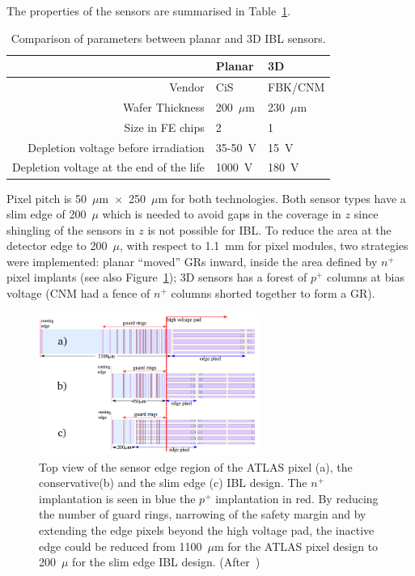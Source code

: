 The properties of the sensors are summarised in Table~\ref{tab:IBLsensors}.

\begin{table}[!htpb]
\caption{\label{tab:IBLsensors}Comparison of parameters between planar and 3D IBL sensors.}
\centering
\begin{tabular}{|r|l|l|}
\hline
 & Planar & 3D\\
 \hline
 \hline
 Vendor & CiS & FBK/CNM \\
 Wafer Thickness & 200~$\mu$m & 230~$\mu$m \\
 Size in FE chips & 2 & 1\\
 Depletion voltage before irradiation & 35-50~V & 15~V \\
 Depletion voltage at the end of the life & 1000~V & 180~V\\
 \hline
 \end{tabular}
\end{table}



Pixel pitch is 50~$\mu$m~$\times$~250~$\mu$m for both technologies. 
Both sensor types have a slim edge of 200~$\mu$ which is needed to avoid gaps in the coverage in $z$ since shingling of the sensors in $z$ is not possible for IBL. 
To reduce the area at the detector edge to 200~$\mu$, with respect to 1.1~mm for pixel modules, 
two strategies were implemented: planar ``moved'' GRs inward, inside the area defined by $n^+$ 
pixel implants (see also Figure~\ref{fig:IBLSlimEdge});  3D sensors has a forest of $p^+$ columns 
at bias voltage (CNM had a fence of $n^+$ columns shorted together to form a GR).

\begin{figure}[!htpb]
\centering
\includegraphics[width=0.65\textwidth]{IBLSlimEdge.png}
\caption{\label{fig:IBLSlimEdge}Top view of the sensor edge region of the ATLAS pixel (a), the conservative(b) and the slim edge (c) IBL design. The $n^+$ implantation is seen in blue the $p^+$ implantation in red. By reducing the number of guard rings, narrowing of the safety margin and by extending the edge pixels beyond the high voltage pad, the inactive edge could be reduced from 1100~$\mu$m for the ATLAS pixel design to 200~$\mu$ for the slim edge IBL design. (After~\cite{WittigPHD})} 
\end{figure}


